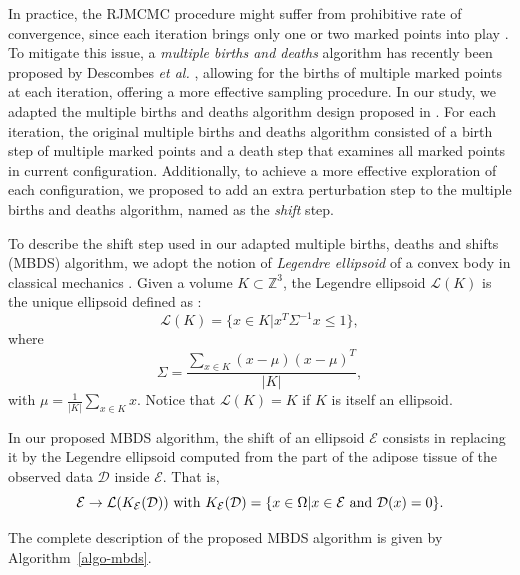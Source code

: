 \documentclass[journal]{IEEEtran}
\begin{document}
In practice, the RJMCMC procedure might suffer from prohibitive rate
of convergence, since each iteration brings only one or two marked
points into play \cite{descombes2013stochastic}. To mitigate this
issue, a \textit{multiple births and deaths} algorithm has recently
been proposed by Descombes \textit{et al.} \cite{descombes2009object},
allowing for the births of multiple marked points at each iteration,
offering a more effective sampling procedure. In our study, we adapted
the multiple births and deaths algorithm design proposed in
\cite{descombes2009object}. For each iteration, the original multiple
births and deaths algorithm consisted of a birth step of multiple
marked points and a death step that examines all marked points in
current configuration. Additionally, to achieve a more effective
exploration of each configuration, we proposed to add an extra
perturbation step to the multiple births and deaths algorithm, named
as the \textit{shift} step.

To describe the shift step used in our adapted multiple births, deaths
and shifts (MBDS) algorithm, we adopt the notion of \textit{Legendre
  ellipsoid} of a convex body in classical mechanics
\cite{lutwak2000new}. Given a volume $K \subset \mathbb{Z}^3$, the
Legendre ellipsoid $\mathcal{L}(K)$ is the unique ellipsoid defined as
\cite{ludwig2003ellipsoids}:
\begin{equation}
  \label{eq:legendre-ellip-orig}
  \mathcal{L}(K) = \{ x \in K | x^T \Sigma^{-1} x \leq 1 \},
\end{equation}
where
\begin{equation}
  \label{eq:legendre-ellip-cov}
  \Sigma = \frac{\sum_{x \in K} (x - \mu)(x - \mu)^T} {|K|},
\end{equation}
with $\mu = \frac{1}{|K|} \sum_{x \in K} x$. Notice that
$\mathcal{L}(K) = K$ if $K$ is itself an ellipsoid.

In our proposed MBDS algorithm, the shift of an ellipsoid
$\mathcal{E}$ consists in replacing it by the Legendre ellipsoid
computed from the part of the adipose tissue of the observed data
$\mathcal{D}$ inside $\mathcal{E}$. That is,
\begin{equation}
  \label{eq:legendre-ellip}
  \mathcal{E} \rightarrow \mathcal{L}(K_{\mathcal{E}}(\mathcal{D}))
  \textnormal{ with } K_{\mathcal{E}}(\mathcal{D}) = \{x \in
  \Omega | x \in \mathcal{E} \textnormal{ and } \mathcal{D}(x) = 0 \}.
\end{equation}

The complete description of the proposed MBDS algorithm is given by
Algorithm~\ref{algo-mbds}.
\end{document}
